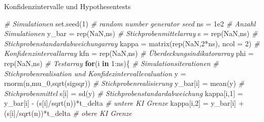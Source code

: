 \documentclass[
  8pt,
  ignorenonframetext,
]{beamer}
\newenvironment{Shaded}{\begin{snugshade}}{\end{snugshade}}
\newcommand{\AttributeTok}[1]{\textcolor[rgb]{0.77,0.63,0.00}{#1}}
\newcommand{\CommentTok}[1]{\textcolor[rgb]{0.56,0.35,0.01}{\textit{#1}}}
\newcommand{\ConstantTok}[1]{\textcolor[rgb]{0.00,0.00,0.00}{#1}}
\newcommand{\ControlFlowTok}[1]{\textcolor[rgb]{0.13,0.29,0.53}{\textbf{#1}}}
\newcommand{\DecValTok}[1]{\textcolor[rgb]{0.00,0.00,0.81}{#1}}
\newcommand{\FloatTok}[1]{\textcolor[rgb]{0.00,0.00,0.81}{#1}}
\newcommand{\FunctionTok}[1]{\textcolor[rgb]{0.00,0.00,0.00}{#1}}
\newcommand{\NormalTok}[1]{#1}
\newcommand{\OtherTok}[1]{\textcolor[rgb]{0.56,0.35,0.01}{#1}}
\newcommand{\SpecialCharTok}[1]{\textcolor[rgb]{0.00,0.00,0.00}{#1}}
\begin{document}
\begin{frame}[fragile]{Konfidenzintervalle und Hypothesentests}
\begin{Shaded}
\begin{Highlighting}[]
\CommentTok{\# Simulationen}
\FunctionTok{set.seed}\NormalTok{(}\DecValTok{1}\NormalTok{)                                           }\CommentTok{\# random number generator seed}
\NormalTok{ns      }\OtherTok{=} \FloatTok{1e2}                                         \CommentTok{\# Anzahl Simulationen}
\NormalTok{y\_bar   }\OtherTok{=} \FunctionTok{rep}\NormalTok{(}\ConstantTok{NaN}\NormalTok{,ns)                                 }\CommentTok{\# Stichprobenmittelarray}
\NormalTok{s       }\OtherTok{=} \FunctionTok{rep}\NormalTok{(}\ConstantTok{NaN}\NormalTok{,ns)                                 }\CommentTok{\# Stichprobenstandardabweichungarray}
\NormalTok{kappa   }\OtherTok{=} \FunctionTok{matrix}\NormalTok{(}\FunctionTok{rep}\NormalTok{(}\ConstantTok{NaN}\NormalTok{,}\DecValTok{2}\SpecialCharTok{*}\NormalTok{ns), }\AttributeTok{ncol =} \DecValTok{2}\NormalTok{)             }\CommentTok{\# Konfidenzintervallarray}
\NormalTok{kfn     }\OtherTok{=} \FunctionTok{rep}\NormalTok{(}\ConstantTok{NaN}\NormalTok{,ns)                                 }\CommentTok{\# Überdeckungsindikatorarray}
\NormalTok{phi     }\OtherTok{=} \FunctionTok{rep}\NormalTok{(}\ConstantTok{NaN}\NormalTok{,ns)                                 }\CommentTok{\# Testarray}
\ControlFlowTok{for}\NormalTok{(i }\ControlFlowTok{in} \DecValTok{1}\SpecialCharTok{:}\NormalTok{ns)\{                                       }\CommentTok{\# Simulationsiterationen}
  \CommentTok{\# Stichprobenrealisation und Konfidezintervallevaluation  }
\NormalTok{  y          }\OtherTok{=} \FunctionTok{rnorm}\NormalTok{(n,mu\_0,}\FunctionTok{sqrt}\NormalTok{(sigsqr))             }\CommentTok{\# Stichprobenrealisierung}
\NormalTok{  y\_bar[i]   }\OtherTok{=} \FunctionTok{mean}\NormalTok{(y)                                }\CommentTok{\# Stichprobenmittel}
\NormalTok{  s[i]       }\OtherTok{=} \FunctionTok{sd}\NormalTok{(y)                                  }\CommentTok{\# Stichprobenstandardabweichung}
\NormalTok{  kappa[i,}\DecValTok{1}\NormalTok{] }\OtherTok{=}\NormalTok{ y\_bar[i] }\SpecialCharTok{{-}}\NormalTok{ (s[i]}\SpecialCharTok{/}\FunctionTok{sqrt}\NormalTok{(n))}\SpecialCharTok{*}\NormalTok{t\_delta      }\CommentTok{\# untere KI Grenze}
\NormalTok{  kappa[i,}\DecValTok{2}\NormalTok{] }\OtherTok{=}\NormalTok{ y\_bar[i] }\SpecialCharTok{+}\NormalTok{ (s[i]}\SpecialCharTok{/}\FunctionTok{sqrt}\NormalTok{(n))}\SpecialCharTok{*}\NormalTok{t\_delta      }\CommentTok{\# obere KI Grenze}


\end{Highlighting}
\end{Shaded}
\end{frame}
\end{document}
